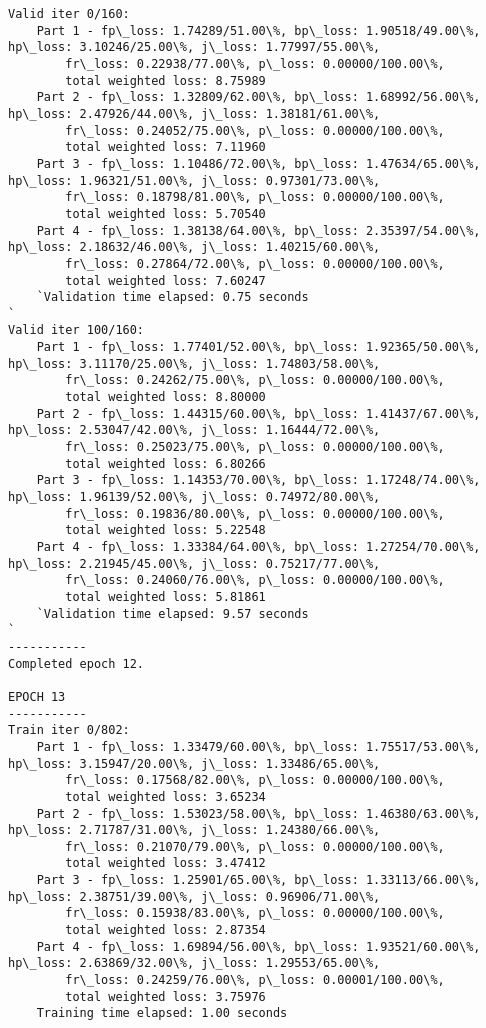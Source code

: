 \documentclass[11pt]{article}
\begin{document}
\begin{Verbatim}[commandchars=\\\{\}]
Valid iter 0/160:
	Part 1 - fp\_loss: 1.74289/51.00\%, bp\_loss: 1.90518/49.00\%, hp\_loss: 3.10246/25.00\%, j\_loss: 1.77997/55.00\%, 
		fr\_loss: 0.22938/77.00\%, p\_loss: 0.00000/100.00\%, 
		total weighted loss: 8.75989
	Part 2 - fp\_loss: 1.32809/62.00\%, bp\_loss: 1.68992/56.00\%, hp\_loss: 2.47926/44.00\%, j\_loss: 1.38181/61.00\%, 
		fr\_loss: 0.24052/75.00\%, p\_loss: 0.00000/100.00\%, 
		total weighted loss: 7.11960
	Part 3 - fp\_loss: 1.10486/72.00\%, bp\_loss: 1.47634/65.00\%, hp\_loss: 1.96321/51.00\%, j\_loss: 0.97301/73.00\%, 
		fr\_loss: 0.18798/81.00\%, p\_loss: 0.00000/100.00\%, 
		total weighted loss: 5.70540
	Part 4 - fp\_loss: 1.38138/64.00\%, bp\_loss: 2.35397/54.00\%, hp\_loss: 2.18632/46.00\%, j\_loss: 1.40215/60.00\%, 
		fr\_loss: 0.27864/72.00\%, p\_loss: 0.00000/100.00\%, 
		total weighted loss: 7.60247
	`Validation time elapsed: 0.75 seconds
`
Valid iter 100/160:
	Part 1 - fp\_loss: 1.77401/52.00\%, bp\_loss: 1.92365/50.00\%, hp\_loss: 3.11170/25.00\%, j\_loss: 1.74803/58.00\%, 
		fr\_loss: 0.24262/75.00\%, p\_loss: 0.00000/100.00\%, 
		total weighted loss: 8.80000
	Part 2 - fp\_loss: 1.44315/60.00\%, bp\_loss: 1.41437/67.00\%, hp\_loss: 2.53047/42.00\%, j\_loss: 1.16444/72.00\%, 
		fr\_loss: 0.25023/75.00\%, p\_loss: 0.00000/100.00\%, 
		total weighted loss: 6.80266
	Part 3 - fp\_loss: 1.14353/70.00\%, bp\_loss: 1.17248/74.00\%, hp\_loss: 1.96139/52.00\%, j\_loss: 0.74972/80.00\%, 
		fr\_loss: 0.19836/80.00\%, p\_loss: 0.00000/100.00\%, 
		total weighted loss: 5.22548
	Part 4 - fp\_loss: 1.33384/64.00\%, bp\_loss: 1.27254/70.00\%, hp\_loss: 2.21945/45.00\%, j\_loss: 0.75217/77.00\%, 
		fr\_loss: 0.24060/76.00\%, p\_loss: 0.00000/100.00\%, 
		total weighted loss: 5.81861
	`Validation time elapsed: 9.57 seconds
`
-----------
Completed epoch 12.

EPOCH 13
-----------
Train iter 0/802:
	Part 1 - fp\_loss: 1.33479/60.00\%, bp\_loss: 1.75517/53.00\%, hp\_loss: 3.15947/20.00\%, j\_loss: 1.33486/65.00\%, 
		fr\_loss: 0.17568/82.00\%, p\_loss: 0.00000/100.00\%, 
		total weighted loss: 3.65234
	Part 2 - fp\_loss: 1.53023/58.00\%, bp\_loss: 1.46380/63.00\%, hp\_loss: 2.71787/31.00\%, j\_loss: 1.24380/66.00\%, 
		fr\_loss: 0.21070/79.00\%, p\_loss: 0.00000/100.00\%, 
		total weighted loss: 3.47412
	Part 3 - fp\_loss: 1.25901/65.00\%, bp\_loss: 1.33113/66.00\%, hp\_loss: 2.38751/39.00\%, j\_loss: 0.96906/71.00\%, 
		fr\_loss: 0.15938/83.00\%, p\_loss: 0.00000/100.00\%, 
		total weighted loss: 2.87354
	Part 4 - fp\_loss: 1.69894/56.00\%, bp\_loss: 1.93521/60.00\%, hp\_loss: 2.63869/32.00\%, j\_loss: 1.29553/65.00\%, 
		fr\_loss: 0.24259/76.00\%, p\_loss: 0.00001/100.00\%, 
		total weighted loss: 3.75976
	Training time elapsed: 1.00 seconds


\end{Verbatim}
\end{document}
